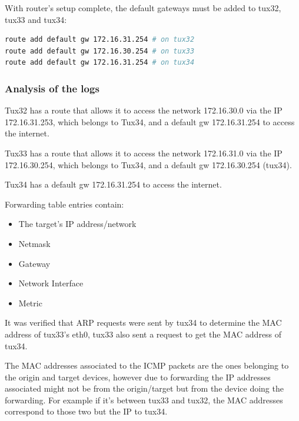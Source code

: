 \documentclass[a4paper,11pt,english]{article}
\begin{document}
            With router's setup complete, the default gateways must be added to tux32, tux33 and tux34:

\begin{lstlisting}[language=sh]
route add default gw 172.16.31.254 # on tux32
route add default gw 172.16.30.254 # on tux33
route add default gw 172.16.31.254 # on tux34
\end{lstlisting}

        \subsubsection{Analysis of the logs}
            Tux32 has a route that allows it to access the network 172.16.30.0 via
            the IP 172.16.31.253, which belongs to Tux34, and a default gw 172.16.31.254
            to access the internet.

            Tux33 has a route that allows it to access the network 172.16.31.0 via
            the IP 172.16.30.254, which belongs to Tux34, and a default gw 172.16.30.254
            (tux34). 

            Tux34 has a default gw 172.16.31.254 to access the internet.


            \noindent Forwarding table entries contain:
            \begin{itemize} 
                \item The target's IP address/network
                \item Netmask
                \item Gateway
                \item Network Interface
                \item Metric
            \end{itemize}

            It was verified that ARP requests were sent by tux34 to determine the MAC address of 
            tux33's eth0, tux33 also sent a request to get the MAC address of tux34.
            
            The MAC addresses associated to the ICMP packets are the ones belonging to the
            origin and target devices, however due to forwarding the IP addresses associated
            might not be from the origin/target but from the device doing the forwarding.
            For example if it's between tux33 and tux32, the MAC addresses correspond to those
            two but the IP to tux34.
            
\end{document}
